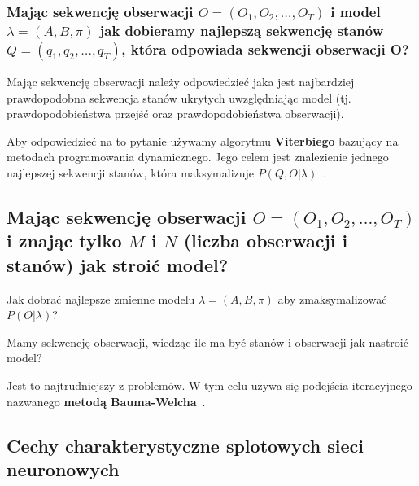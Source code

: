 \documentclass[wi]{zut}
\begin{document}
\subsubsection{Mając sekwencję obserwacji $O = (O_1, O_2, \ldots, O_T)$ i model $\lambda = (A, B, \pi)$ jak dobieramy najlepszą sekwencję stanów $Q = (q_1, q_2, \ldots, q_T)$, która odpowiada sekwencji obserwacji O?}

Mając sekwencję obserwacji należy odpowiedzieć jaka jest najbardziej prawdopodobna sekwencja stanów ukrytych uwzględniając model (tj. prawdopodobieństwa przejść oraz prawdopodobieństwa obserwacji).

Aby odpowiedzieć na to pytanie używamy algorytmu \textbf{Viterbiego} bazujący na metodach programowania dynamicznego. Jego celem jest znalezienie jednego najlepszej sekwencji stanów, która maksymalizuje $P(Q, O|\lambda)$~\cite{Pietrzykowski2020}.

\subsection{Mając sekwencję obserwacji $O = (O_1, O_2, \ldots, O_T)$ i znając tylko $M$ i $N$ (liczba obserwacji i stanów) jak stroić model?}

Jak dobrać najlepsze zmienne modelu $\lambda = (A, B, \pi)$ aby zmaksymalizować $P(O|\lambda)$?

Mamy sekwencję obserwacji, wiedząc ile ma być stanów i obserwacji jak nastroić model?

Jest to najtrudniejszy z problemów. W tym celu używa się podejścia iteracyjnego nazwanego \textbf{metodą Bauma-Welcha}~\cite{Pietrzykowski2020}.



\subsection{Cechy charakterystyczne splotowych sieci neuronowych}
\end{document}
